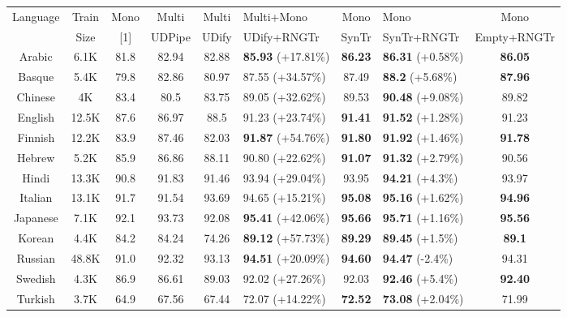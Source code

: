 \begin{table*}[bt]
  \centering
  \begin{adjustbox}{width=\linewidth}
  \begin{tabular}{|c|c|c|c|cl|cl|c|}
    \hline
    \multirow{2}{*}{Language} & Train &  Mono & Multi & Multi & Multi+Mono & Mono & Mono & Mono \\
    &  Size & [1] & UDPipe & UDify & UDify+RNGTr & SynTr & SynTr+RNGTr & Empty+RNGTr \\
    \hline
    Arabic & 6.1K & 81.8 & 82.94 & 82.88 & \textbf{85.93} (+17.81\%) & \textbf{86.23} & \textbf{86.31} (+0.58\%) & \textbf{86.05} \\
    Basque & 5.4K & 79.8 & 82.86 & 80.97 & 87.55 (+34.57\%) & 87.49 & \textbf{88.2} (+5.68\%) & \textbf{87.96} \\
    Chinese & 4K & 83.4 & 80.5 & 83.75 & 89.05 (+32.62\%) & 89.53 & \textbf{90.48} (+9.08\%)  & 89.82 \\
    English & 12.5K & 87.6 & 86.97 & 88.5 & 91.23 (+23.74\%) & \textbf{91.41} & \textbf{91.52} (+1.28\%) & 91.23 \\
    Finnish & 12.2K & 83.9 & 87.46 & 82.03 & \textbf{91.87} (+54.76\%) & \textbf{91.80} & \textbf{91.92} (+1.46\%) & \textbf{91.78} \\
    Hebrew & 5.2K & 85.9 & 86.86 & 88.11 & 90.80 (+22.62\%) & \textbf{91.07} & \textbf{91.32} (+2.79\%) & 90.56 \\
    Hindi & 13.3K & 90.8 & 91.83 & 91.46 & 93.94 (+29.04\%) & 93.95 & \textbf{94.21} (+4.3\%) & 93.97 \\
    Italian &13.1K & 91.7 & 91.54 & 93.69 & 94.65 (+15.21\%) & \textbf{95.08} & \textbf{95.16} (+1.62\%) & \textbf{94.96} \\
    Japanese & 7.1K & 92.1 & 93.73 & 92.08 & \textbf{95.41} (+42.06\%) & \textbf{95.66} & \textbf{95.71} (+1.16\%) & \textbf{95.56} \\
    Korean & 4.4K & 84.2 & 84.24 & 74.26 & \textbf{89.12} (+57.73\%) & \textbf{89.29} & \textbf{89.45} (+1.5\%) & \textbf{89.1} \\
    Russian & 48.8K & 91.0 & 92.32 & 93.13 & \textbf{94.51} (+20.09\%) & \textbf{94.60} & \textbf{94.47} (-2.4\%) & 94.31 \\
    Swedish & 4.3K & 86.9 & 86.61 & 89.03 & 92.02 (+27.26\%) & 92.03 & \textbf{92.46} (+5.4\%) & \textbf{92.40} \\
    Turkish & 3.7K & 64.9 & 67.56 & 67.44 & 72.07 (+14.22\%) & \textbf{72.52} & \textbf{73.08} (+2.04\%) & 71.99 \\

\end{tabular}
\end{adjustbox}
\end{table*}
